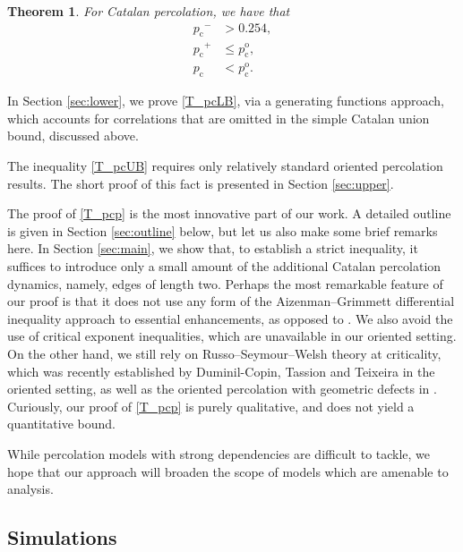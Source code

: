 \documentclass[pdflatex,sn-mathphys-num]{sn-jnl}%
\newcommand{\1}{{\ensuremath{\mathbf{1}}} }
\newcommand{\pc}{\ensuremath{p_{\mathrm{c}} }}
\newcommand{\pco}{\ensuremath{p_{\mathrm{c}}^{\mathrm{o}} }}
\theoremstyle{thmstyleone}%
\newtheorem{theorem}{Theorem}%
\theoremstyle{thmstyletwo}%
\theoremstyle{thmstylethree}%
\begin{document}
\begin{theorem}
\label{th:main}
For Catalan percolation, we have that 
\begin{align}
\label{T_pcLB}
\pc^-&{}> 0.254 
,\\
\label{T_pcUB}\pc^+&{}\le \pco,\\
\label{T_pcp}\pc&{}<\pco.
\end{align}
\end{theorem}

In Section \ref{sec:lower}, we prove 
\eqref{T_pcLB}, via a generating functions approach, which accounts for correlations  
that are omitted in the simple Catalan union bound, discussed above. 

The inequality \eqref{T_pcUB} requires only relatively standard oriented percolation results. 
The short proof of this fact is presented in Section \ref{sec:upper}. 

The proof of \eqref{T_pcp} is the most innovative part of our work. A detailed outline is given in Section \ref{sec:outline} below, 
but let us also make some brief remarks here. 
In Section \ref{sec:main}, we show that, to establish a strict inequality, 
it suffices to introduce only a small amount of the additional 
Catalan percolation dynamics, namely, edges of length two. 
Perhaps the most remarkable feature of our proof is that it does not use 
any form of the Aizenman--Grimmett differential inequality approach to essential enhancements, 
as opposed to \cite{Duminil-Copin18b}. 
We also avoid the use of critical exponent inequalities, which are unavailable in our oriented setting. On the other hand, we still rely on Russo--Seymour--Welsh theory at criticality, which was
 recently established by Duminil-Copin, Tassion and Teixeira \cite{Duminil-Copin17} in the oriented setting, 
 as well as the oriented percolation with geometric defects in \cite{Hilario23}. Curiously, our proof of \eqref{T_pcp} is purely qualitative, and does not yield a quantitative bound. 
 
 While percolation models with strong dependencies are difficult to tackle, we hope that our approach will broaden 
 the scope of models which are amenable to analysis.



\subsection{Simulations}
\end{document}
